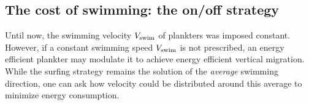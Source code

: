 % 

\subsection{The cost of swimming: the on/off strategy}\label{sec:on_off}

Until now, the swimming velocity $V_{\mathrm{swim}}$ of plankters was imposed constant. 
However, if a constant swimming speed $V_{\mathrm{swim}}$ is not prescribed, an energy efficient plankter may modulate it to achieve energy efficient vertical migration. 
While the surfing strategy remains the solution of the \textit{average} swimming direction, one can ask how velocity could be distributed around this average to minimize energy consumption.

